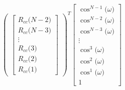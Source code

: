 \documentclass{article}
\begin{document}
\begin{align*}
\begin{pmatrix}
\begin{bmatrix}
                                                                R_{cc}\big(N - 2\big) \\
                                                                R_{cc}\big(N - 3\big) \\
                                                                \vdots \\
                                                                R_{cc}\big(3\big) \\
                                                                R_{cc}\big(2\big) \\
                                                                R_{cc}\big(1\big)
                                                              \end{bmatrix}
                                                              \end{pmatrix}^{T}
                                                        \begin{bmatrix}
                                                            \cos^{N - 1}\big(\omega\big) \\
                                                            \cos^{N - 2}\big(\omega\big) \\
                                                            \cos^{N - 3}\big(\omega\big) \\
                                                            \vdots \\
                                                            \cos^{3}\big(\omega\big) \\
                                                            \cos^{2}\big(\omega\big) \\
                                                            \cos^{1}\big(\omega\big) \\
                                                            1 
                                                          \end{bmatrix}
\end{align*}
\end{document}
